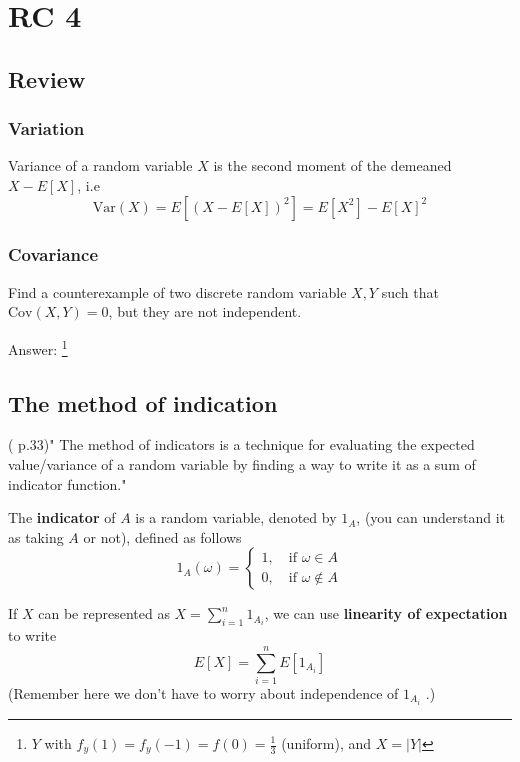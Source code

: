 \chapter{RC 4}

\section{Review}
\subsection{Variation}
Variance of a random variable \(X\) is the second moment of the demeaned \(X-E[X]\), i.e
\[
    \text{Var} (X) = E[(X-E[X])^2] = E[X^2] - E[X]^2
\]
\subsection{Covariance}
\begin{exercise}
    Find a counterexample of two discrete random variable \(X,Y\) such that \(\text{Cov}(X,Y) = 0  \), but they are not independent. 
\end{exercise}
Answer: \footnote[1]{\(Y\) with \(f_y(1) = f_y(-1) = f(0) = \frac{1}{3}\) (uniform), and \(X = |Y|\) } 
\section{The method of indication}
(\cite{Und_Chatterjee} p.33)" The method of indicators is a technique for evaluating the expected value/variance of a random variable by finding a way to write it as a sum of indicator function."

The \textbf{indicator} of \(A\) is a random variable, denoted by \(1_A\), (you can understand it as taking \(A\) or not), defined as follows  
\[
    1_A(\omega) = \begin{cases} 1, \quad \text{if } \omega \in A \\ 0,\quad \text{if } \omega \notin A \end{cases}
\]

If \(X\) can be represented as \(X = \sum_{i=1}^{n} 1_{A_i}\), we can use \textbf{linearity of expectation} to write 
\[
    E[X] = \sum_{i=1}^{n} E[1_{A_i}]
\]  
(Remember here we don't have to worry about independence of \(1_{A_i}\) .)
